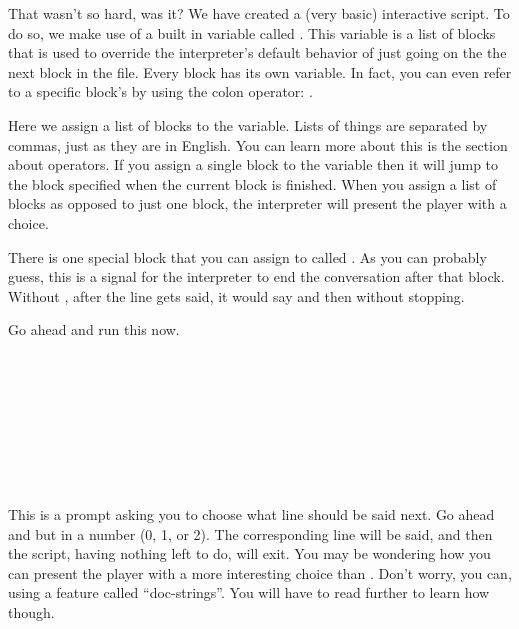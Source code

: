 That wasn't so hard, was it?  We have created a (very basic) interactive script.  To do so, we make use of a built in variable called .  This variable is a list of blocks that is used to override the interpreter's default behavior of just going on the the next block in the file.  Every block has its own  variable.   In fact, you can even refer to a specific block's  by using the colon operator:  .

 Here we assign a list of blocks to the  variable.  Lists of things are separated by commas, just as they are in English.  You can learn more about this is the section about operators.  If you assign a single block to the  variable then it will jump to the block specified when the current block is finished.  When you assign a list of blocks as opposed to just one block, the interpreter will present the player with a choice.

 There is one special block that you can assign to called .  As you can probably guess, this is a signal for the interpreter to end the conversation after that block. Without , after the line  gets said, it would say  and then  without stopping.

Go ahead and run this now.

\begin{SSCodeBox}
 \\
 \\ \\
 \\
 \\
 \\ \\
\scited{>}
\end{SSCodeBox}

This is a prompt asking you to choose what line should be said next.  Go ahead and but in a number (0, 1, or 2).  The corresponding line will be said, and then the script, having nothing left to do, will exit.  You may be wondering how you can present the player with a more interesting choice than .  Don't worry, you can, using a feature called ``doc-strings''.  You will have to read further to learn how though.

